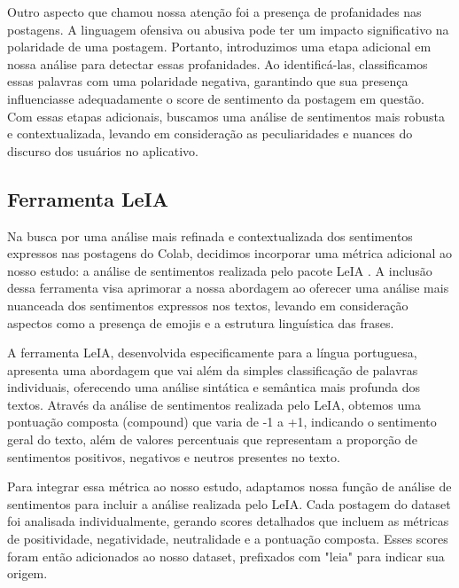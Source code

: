 Outro aspecto que chamou nossa atenção foi a presença de profanidades nas postagens. A linguagem ofensiva ou abusiva pode ter um impacto significativo na polaridade de uma postagem. Portanto, introduzimos uma etapa adicional em nossa análise para detectar essas profanidades. Ao identificá-las, classificamos essas palavras com uma polaridade negativa, garantindo que sua presença influenciasse adequadamente o score de sentimento da postagem em questão. Com essas etapas adicionais, buscamos uma análise de sentimentos mais robusta e contextualizada, levando em consideração as peculiaridades e nuances do discurso dos usuários no aplicativo.

\subsection{Ferramenta LeIA}
\label{sec:ferramenta_leia}
Na busca por uma análise mais refinada e contextualizada dos sentimentos expressos nas postagens do Colab, decidimos incorporar uma métrica adicional ao nosso estudo: a análise de sentimentos realizada pelo pacote LeIA \cite{2018_Almeida_PAGE}. A inclusão dessa ferramenta visa aprimorar a nossa abordagem ao oferecer uma análise mais nuanceada dos sentimentos expressos nos textos, levando em consideração aspectos como a presença de emojis e a estrutura linguística das frases.

A ferramenta LeIA, desenvolvida especificamente para a língua portuguesa, apresenta uma abordagem que vai além da simples classificação de palavras individuais, oferecendo uma análise sintática e semântica mais profunda dos textos. Através da análise de sentimentos realizada pelo LeIA, obtemos uma pontuação composta (compound) que varia de -1 a +1, indicando o sentimento geral do texto, além de valores percentuais que representam a proporção de sentimentos positivos, negativos e neutros presentes no texto.

Para integrar essa métrica ao nosso estudo, adaptamos nossa função de análise de sentimentos para incluir a análise realizada pelo LeIA. Cada postagem do dataset foi analisada individualmente, gerando scores detalhados que incluem as métricas de positividade, negatividade, neutralidade e a pontuação composta. Esses scores foram então adicionados ao nosso dataset, prefixados com "leia" para indicar sua origem.

